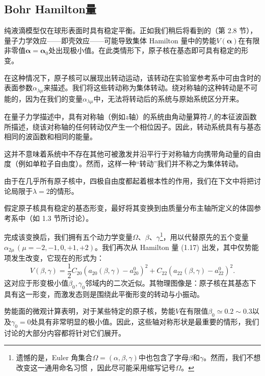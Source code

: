 \subsection{Bohr Hamilton量\label{subsec:Bohr-Hamilton=0091CF}}

纯液滴模型仅在球形表面时具有稳定平衡。正如我们稍后将看到的（第 2.8 节），量子力学效应——即壳效应——可能导致集体 Hamilton
量中的势能$V(\boldsymbol{\alpha})$在有限非零值$\boldsymbol{\alpha}=\boldsymbol{\alpha}_{0}$处出现极小值。在此类情形下，原子核在基态即可具有稳定的形变。

在这种情况下，原子核可以展现出转动运动，该转动在实验室参考系中可由含时的表面参数$\alpha_{\lambda\mu}$来描述。我们将这些转动称为集体转动。绕对称轴的这种转动是不可能的，因为在我们的变量$\alpha_{\lambda\mu}$中，无法将转动后的系统与原始系统区分开来。

在量子力学描述中，具有对称轴（例如$z$轴）的系统由角动量算符$J_{z}$的本征波函数所描述，绕该对称轴的任何转动仅产生一个相位因子。因此，转动系统具有与基态相同的波函数和相同的能量。

这并不意味着系统中不存在其他可被激发并沿平行于对称轴方向携带角动量的自由度（例如单粒子自由度）。然而，这样一种“转动”我们并不称之为集体转动。

由于在几乎所有原子核中，四极自由度都起着根本性的作用，我们在下文中将把讨论局限于$\lambda=2$的情形。

假定原子核具有稳定的基态形变，最好将其变换到由质量分布主轴所定义的体固参考系中（如 1.3 节所讨论）。

完成该变换后，我们拥有五个动力学变量$\Omega$、$\beta$、$\gamma$\footnote{遗憾的是，Euler 角集合$\Omega=(\alpha,\beta,\gamma)$中也包含了字母$\beta$和$\gamma$。然而，我们不想改变这一通用命名习惯
\cite{Ed57}，因此尽可能采用缩写记号$\Omega$。}，用以代替原先的五个变量$\alpha_{2\mu}\,(\mu=-2,-1,0,+1,+2)$。我们再次从 Hamilton 量
(1.17) 出发，其中仅势能项发生改变，它现在的形式为：
\begin{equation}
V(\beta,\gamma)=\frac{1}{2}C_{20}(a_{20}(\beta,\gamma)-a^{0}_{20})^{2}+C_{22}(a_{22}(\beta,\gamma)-a^{0}_{22})^{2}.\label{eq:1.46}
\end{equation}
这对应于形变极小值$\beta_{0},\gamma_{0}$邻域内的二次近似。其物理图像是：原子核在其基态下具有这一形变，而激发态则是围绕此平衡形变的转动与小振动。

势能面的微观计算表明，对于某些特定的原子核，势能$V$在有限值$\beta_{0}\simeq0.2\sim0.3$以及$\gamma_{0}=0$处具有非常明显的极小值。因此，这些轴对称形状是最重要的情形，我们讨论的大部分内容都将针对它们展开。

